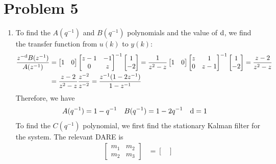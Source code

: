 \section*{Problem 5}

\begin{enumerate}
    \item
    To find the $A(q^{-1})$ and $B(q^{-1})$ polynomials and the value of $\textrm{d}$, we find the transfer function from $u(k)$ to $y(k)$:
    \begin{align*}
        \frac{ z^{-\textrm{d}} B(z^{-1}) }{ A(z^{-1}) } & = \begin{bmatrix}
                1 & 0
            \end{bmatrix} \begin{bmatrix}
                z - 1 & -1 \\
                0 & z
            \end{bmatrix}^{-1} \begin{bmatrix}
                1 \\
                -2
            \end{bmatrix} = \frac{1}{z^2 - z} \begin{bmatrix}
                1 & 0
            \end{bmatrix} \begin{bmatrix}
                z & 1 \\
                0 & z-1
            \end{bmatrix}^{-1} \begin{bmatrix}
                1 \\
                -2
            \end{bmatrix} = \frac{z - 2}{z^2 - z} \\
        & = \frac{z - 2}{z^2 - z} \frac{z^{-2}}{z^{-2}} = \frac{ z^{-1} (1 - 2z^{-1}) }{ 1 - z^{-1} }
    \end{align*}
    Therefore, we have
    \begin{align*}
        A(q^{-1}) & = 1 - q^{-1}
            & B(q^{-1}) & = 1 - 2q^{-1}
            & \textrm{d} & = 1
    \end{align*}
    To find the $C(q^{-1})$ polynomial, we first find the stationary Kalman filter for the system. The relevant DARE is
    \begin{align*}
        \begin{bmatrix}
                m_1 & m_2 \\
                m_2 & m_3
            \end{bmatrix} & = \begin{bmatrix}

\end{bmatrix}
\end{align*}
\end{enumerate}
